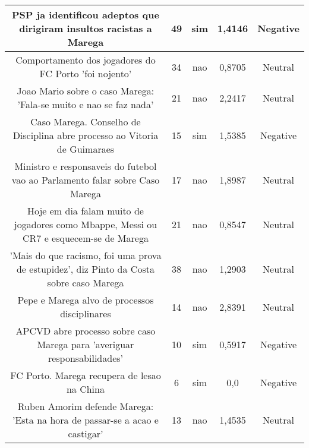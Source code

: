 \documentclass[11pt]{article}
\newlength\mylength
\begin{document}
\begin{center}
\begin{longtable}{||C{.40\mylength}||C{.20\mylength}||C{.20\mylength}||C{.30\mylength}||C{.20\mylength}||}
   PSP ja identificou adeptos que dirigiram insultos racistas a Marega  & 49 & sim & 1,4146 & Negative \\  \hline
   Comportamento dos jogadores do FC Porto 'foi nojento'  & 34 & nao & 0,8705 & Neutral \\  \hline
   Joao Mario sobre o caso Marega: 'Fala-se muito e nao se faz nada'  & 21 & nao & 2,2417 & Neutral \\  \hline
   Caso Marega. Conselho de Disciplina abre processo ao Vitoria de Guimaraes  & 15 & sim & 1,5385 & Negative \\  \hline
   Ministro e responsaveis do futebol vao ao Parlamento falar sobre Caso Marega  & 17 & nao & 1,8987 & Neutral \\  \hline
   Hoje em dia falam muito de jogadores como Mbappe, Messi ou CR7 e esquecem-se de Marega  & 21 & nao & 0,8547 & Neutral \\  \hline
   'Mais do que racismo, foi uma prova de estupidez', diz Pinto da Costa sobre caso Marega  & 38 & nao & 1,2903 & Neutral \\  \hline
   Pepe e Marega alvo de processos disciplinares  & 14 & nao & 2,8391 & Neutral \\  \hline
   APCVD abre processo sobre caso Marega para 'averiguar responsabilidades'  & 10 & sim & 0,5917 & Negative \\  \hline
   FC Porto. Marega recupera de lesao na China  & 6 & sim & 0,0 & Negative \\  \hline
   Ruben Amorim defende Marega: 'Esta na hora de passar-se a acao e castigar'  & 13 & nao & 1,4535 & Neutral \\  \hline

\end{longtable}
\end{center}
\end{document}
